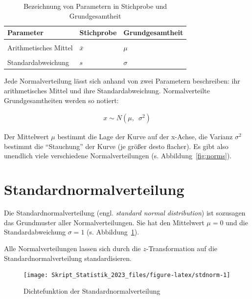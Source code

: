 \documentclass[
  11pt,
  ngerman,
  a4paper,
]{report}
\begin{document}
\begin{table}

\caption{\label{tab:param}Bezeichnung von Parametern in Stichprobe und Grundgesamtheit}
\centering
\begin{tabular}[t]{lll}
\toprule
\textbf{Parameter} & \textbf{Stichprobe} & \textbf{Grundgesamtheit}\\
\midrule
\cellcolor{gray!6}{Anzahl Elemente} & \cellcolor{gray!6}{$n$} & \cellcolor{gray!6}{$N$}\\
Arithmetisches Mittel & $\bar{x}$ & $\mu$\\
\cellcolor{gray!6}{Varianz} & \cellcolor{gray!6}{$s^2$} & \cellcolor{gray!6}{$\sigma^2$}\\
Standardabweichung & $s$ & $\sigma$\\
\bottomrule
\end{tabular}
\end{table}

Jede Normalverteilung lässt sich anhand von zwei Parametern beschreiben: ihr arithmetisches Mittel und ihre Standardabweichung. Normalverteilte Grundgesamtheiten werden so notiert:

\nopagebreak

\[\begin{aligned}
x \sim N(\mu,\enspace\sigma^2)
\end{aligned}
\label{eq:norm}\]

Der Mittelwert \(\mu\) bestimmt die Lage der Kurve auf der x-Achse, die Varianz \(\sigma^2\) bestimmt die \enquote{Stauchung} der Kurve (je größer desto flacher). Es gibt also unendlich viele verschiedene Normalverteilungen (s. Abbildung~\ref{fig:norms}).

\hypertarget{standardnormalverteilung}{%
\section{Standardnormalverteilung}\label{standardnormalverteilung}}

Die Standardnormalverteilung (engl. \emph{standard normal distribution}) ist sozusagen das Grundmuster aller Normalverteilungen. Sie hat den Mittelwert \(\mu=0\) und die Standardabweichung \(\sigma=1\) (s. Abbildung~\ref{fig:stdnorm}).

Alle Normalverteilungen lassen sich durch die \(z\)-Transformation auf die Standardnormalverteilung standardisieren.

\begin{figure}[!h]

{\centering \texttt{[image: Skript\_Statistik\_2023\_files/figure-latex/stdnorm-1]} 

}

\caption{Dichtefunktion der Standardnormalverteilung}\label{fig:stdnorm}
\end{figure}
\end{document}
